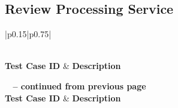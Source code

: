 \subsection{Review Processing Service}

\begin{longtable}{|p{}|p{}|}
\caption{Results \& Monitoring Service Test Cases and Descriptions}\\
\hline
\textbf{Test Case ID} & \textbf{Description} \\
\hline
\endfirsthead

%
{{\bfseries \tablename\ \thetable{} -- continued from previous page}} \\
\hline
\textbf{Test Case ID} & \textbf{Description} \\
\hline
\endhead

\hline {} \\
\endfoot

\hline
\endlastfoot


\end{longtable}
